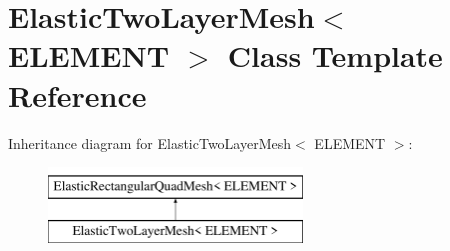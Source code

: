 \hypertarget{classElasticTwoLayerMesh}{}\section{Elastic\+Two\+Layer\+Mesh$<$ E\+L\+E\+M\+E\+NT $>$ Class Template Reference}
\label{classElasticTwoLayerMesh}
Inheritance diagram for Elastic\+Two\+Layer\+Mesh$<$ E\+L\+E\+M\+E\+NT $>$\+:\begin{figure}[H]
\begin{center}
\leavevmode
\includegraphics[height=2.000000cm]{classElasticTwoLayerMesh}
\end{center}
\end{figure}
